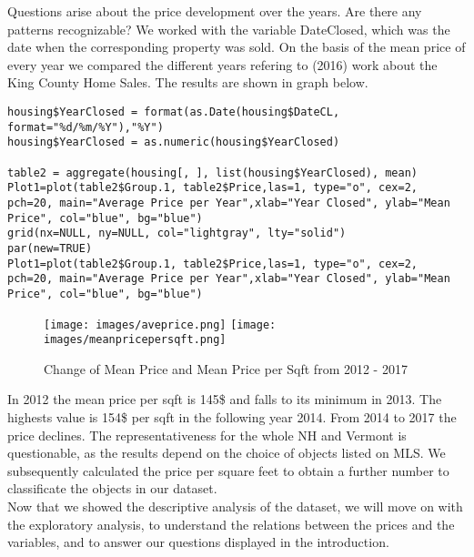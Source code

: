 Questions arise about the price development over the years. Are there any patterns recognizable? We worked with the variable DateClosed, which was the date when the corresponding property was sold. On the basis of the mean price of every year we compared the different years refering to \citeauthor{murilloking} (2016) work about the King County Home Sales.  The results are shown in graph below. \\

\begin{lstlisting}[frame = single,backgroundcolor=\color{hellgelb}]
housing$YearClosed = format(as.Date(housing$DateCL, format="%d/%m/%Y"),"%Y")
housing$YearClosed = as.numeric(housing$YearClosed)

table2 = aggregate(housing[, ], list(housing$YearClosed), mean)
Plot1=plot(table2$Group.1, table2$Price,las=1, type="o", cex=2, pch=20, main="Average Price per Year",xlab="Year Closed", ylab="Mean Price", col="blue", bg="blue")
grid(nx=NULL, ny=NULL, col="lightgray", lty="solid")
par(new=TRUE)
Plot1=plot(table2$Group.1, table2$Price,las=1, type="o", cex=2, pch=20, main="Average Price per Year",xlab="Year Closed", ylab="Mean Price", col="blue", bg="blue")
\end{lstlisting}

\begin{figure}[ht]
\centering
	\texttt{[image: images/aveprice.png]}
	\texttt{[image: images/meanpricepersqft.png]}
	\caption{Change of Mean Price and Mean Price per Sqft from 2012 - 2017}
\label{}
\end{figure}


In 2012 the mean price  per sqft is 145\$  and falls to its minimum in 2013. The highests value is 154\$ per sqft in the following year 2014. From 2014 to 2017 the price declines.
The representativeness for the whole NH and Vermont is questionable, as the results depend on the choice of objects listed on MLS.
We subsequently calculated the price per square feet to obtain a further number to classificate the objects in our dataset. \\





Now that we showed the descriptive analysis of the dataset, we will move on with the exploratory analysis, to understand the relations between the prices and the variables, and to answer our questions displayed in the introduction. \\
